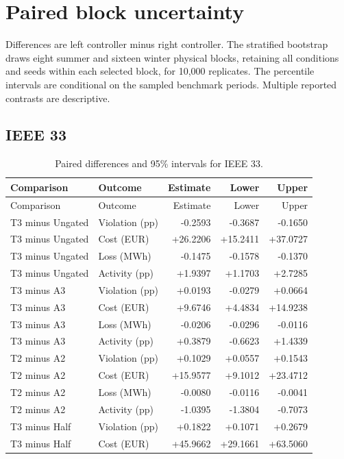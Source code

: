 \documentclass[11pt]{article}
\begin{document}
\section{Paired block uncertainty}
Differences are left controller minus right controller. The stratified bootstrap draws eight summer and sixteen winter physical blocks, retaining all conditions and seeds within each selected block, for 10,000 replicates. The percentile intervals are conditional on the sampled benchmark periods. Multiple reported contrasts are descriptive.
\subsection{IEEE 33}

\small\begin{longtable}{llrrr}
\caption{Paired differences and 95\% intervals for IEEE 33.}\\\toprule
Comparison & Outcome & Estimate & Lower & Upper\\\midrule
\endfirsthead
\toprule
Comparison & Outcome & Estimate & Lower & Upper\\\midrule
\endhead
\bottomrule\endfoot
T3 minus Ungated & Violation (pp) & -0.2593 & -0.3687 & -0.1650\\
T3 minus Ungated & Cost (EUR) & +26.2206 & +15.2411 & +37.0727\\
T3 minus Ungated & Loss (MWh) & -0.1475 & -0.1578 & -0.1370\\
T3 minus Ungated & Activity (pp) & +1.9397 & +1.1703 & +2.7285\\
T3 minus A3 & Violation (pp) & +0.0193 & -0.0279 & +0.0664\\
T3 minus A3 & Cost (EUR) & +9.6746 & +4.4834 & +14.9238\\
T3 minus A3 & Loss (MWh) & -0.0206 & -0.0296 & -0.0116\\
T3 minus A3 & Activity (pp) & +0.3879 & -0.6623 & +1.4339\\
T2 minus A2 & Violation (pp) & +0.1029 & +0.0557 & +0.1543\\
T2 minus A2 & Cost (EUR) & +15.9577 & +9.1012 & +23.4712\\
T2 minus A2 & Loss (MWh) & -0.0080 & -0.0116 & -0.0041\\
T2 minus A2 & Activity (pp) & -1.0395 & -1.3804 & -0.7073\\
T3 minus Half & Violation (pp) & +0.1822 & +0.1071 & +0.2679\\
T3 minus Half & Cost (EUR) & +45.9662 & +29.1661 & +63.5060\\

\end{longtable}
\end{document}
